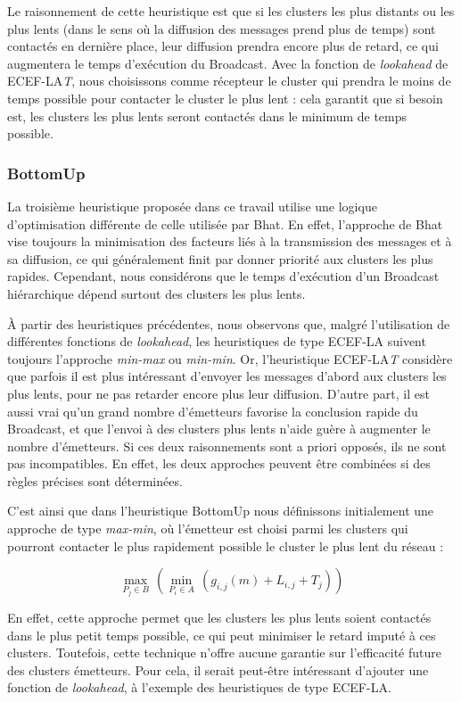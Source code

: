 Le raisonnement de cette heuristique est que si les  clusters les plus
distants ou les plus lents (dans le sens où la diffusion des messages
prend plus de temps) sont contactés en dernière place, leur diffusion
prendra encore plus de retard, ce qui augmentera le temps d'exécution
du Broadcast. Avec la fonction de \emph{lookahead} de ECEF-LA\emph{T},
nous choisissons comme récepteur le  cluster qui prendra le moins de
temps possible pour contacter le  cluster le plus lent : cela garantit
que si besoin est, les  clusters les plus lents seront contactés dans
le minimum de temps possible.


\subsubsection*{BottomUp}

La troisième heuristique proposée dans ce travail utilise une logique
d'optimisation différente de celle utilisée par Bhat. En effet, l'approche
de Bhat vise toujours la minimisation des facteurs liés à la transmission
des messages et à sa diffusion, ce qui généralement finit par donner
priorité aux  clusters les plus rapides. Cependant, nous considérons
que le temps d'exécution d'un Broadcast hiérarchique dépend surtout
des  clusters les plus lents.

À partir des heuristiques précédentes, nous observons que, malgré
l'utilisation de différentes fonctions de \emph{lookahead}, les heuristiques
de type ECEF-LA suivent toujours l'approche \emph{min-max} ou \emph{min-min}.
Or, l'heuristique ECEF-LA\emph{T} considère que parfois il est plus
intéressant d'envoyer les messages d'abord aux  clusters les plus lents,
pour ne pas retarder encore plus leur diffusion. D'autre part, il
est aussi vrai qu'un grand nombre d'émetteurs favorise la conclusion
rapide du Broadcast, et que l'envoi à des  clusters plus lents n'aide
guère à augmenter le nombre d'émetteurs. Si ces deux raisonnements
sont a priori opposés, ils ne sont pas incompatibles. En effet, les
deux approches peuvent être combinées si des règles précises sont
déterminées.

C'est ainsi que dans l'heuristique BottomUp nous définissons initialement
une approche de type \emph{max-min}, où l'émetteur est choisi parmi
les  clusters qui pourront contacter le plus rapidement possible le
 cluster le plus lent du réseau :

\[
\max_{P_{j}\in B}\,(\min_{P_{i}\in A}\,(g_{i,j}(m)+L_{i,j}+T_{j}))\]


En effet, cette approche permet que les  clusters les plus lents soient
contactés dans le plus petit temps possible, ce qui peut minimiser
le retard imputé à ces  clusters. Toutefois, cette technique n'offre
aucune garantie sur l'efficacité future des  clusters émetteurs. Pour
cela, il serait peut-être intéressant d'ajouter une fonction de \emph{lookahead},
à l'exemple des heuristiques de type ECEF-LA.


